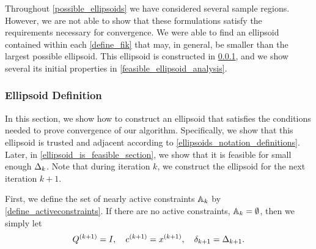 Throughout \cref{possible_ellipsoids} we have considered several sample regions.
However, we are not able to show that these formulations satisfy the requirements necessary for convergence.  
We were able to find an ellipsoid contained within each \cref{define_fik} that may, in general, be smaller than the largest possible ellipsoid.
This ellipsoid is constructed in \cref{conservative_ellipsoid_construction}, and we show several its initial properties in \cref{feasible_ellipsoid_analysis}.


\subsubsection{Ellipsoid Definition}
\label{conservative_ellipsoid_construction}

In this section,  we show how to construct an ellipsoid that satisfies the conditions needed to prove convergence of our algorithm.
Specifically, we show that this ellipsoid is
trusted and adjacent
according to \cref{ellipsoids_notation_definitions}.
Later, in \cref{ellipsoid_is_feasible_section}, we show that it is feasible for small enough $\Delta_k$.
Note that during iteration $k$, we construct the ellipsoid for the next iteration $k+1$.


First, we define the set of nearly active constraints ${\mathbb A_{k}}$ by \cref{define_activeconstraints}.
If there are no active constraints, ${\mathbb A_{k}} = \emptyset$, then we simply let
\begin{align}
{Q^{(k+1)}} = I, \quad {c^{(k+1)}} = {{x}^{(k+1)}}, \quad {\delta_{k+1}} = \Delta_{k+1}. \label{define_trivial_ellipsek}
\end{align}

